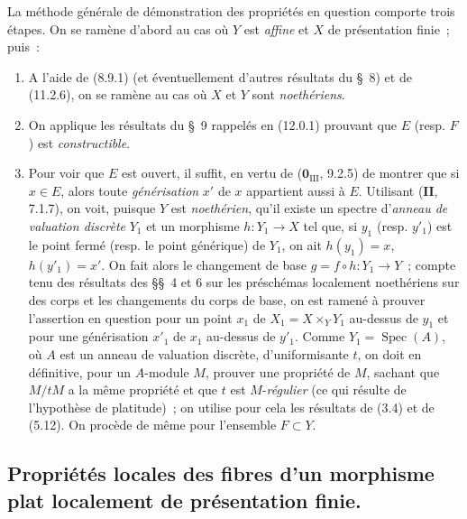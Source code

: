 \begin{env}[12.0.2]
\label{IV.12.0.2-fr}
La méthode générale de démonstration des propriétés en question comporte trois
étapes. On se ramène d'abord au cas où $Y$ est \emph{affine} et $X$ de présentation
finie~; puis~:
\begin{enumerate}[label=\Alph*)]
  \item A l'aide de (8.9.1) (et éventuellement d'autres résultats du \S~8) et
  de (11.2.6), on se ramène au cas où $X$ et $Y$ sont \emph{noethériens}.
  \item On applique les résultats du \S~9 rappelés en (12.0.1) prouvant que
  $E$ (resp. $F$) est \emph{constructible}.
  \item Pour voir que $E$ est ouvert, il suffit, en vertu de
  ($\mathbf 0_{\mathrm{III}}$, 9.2.5) de montrer que si $x\in E$, alors toute
  \emph{générisation} $x'$ de $x$ appartient aussi à $E$. Utilisant ($\mathbf{II}$,
  7.1.7), on voit, puisque $Y$ est \emph{noethérien}, qu'il existe un spectre d'\emph{anneau
  de valuation discrète} $Y_1$ et un morphisme $h:Y_1\to X$ tel que, si $y_1$
  (resp. $y'_1$) est le point fermé (resp. le point générique) de $Y_1$, on ait
  $h(y_1)=x$, $h(y'_1)=x'$. On fait alors le changement de base
  $g=f\circ h:Y_1\to Y$~; compte tenu des résultats des \S\S~4 et 6 sur les
  préschémas localement noethériens sur des corps et les changements du corps
  de base, on est ramené à prouver l'assertion en question pour un point $x_1$
  de $X_1=X\times_YY_1$ au-dessus de $y_1$ et pour une générisation $x'_1$ de
  $x_1$ au-dessus de $y'_1$. Comme $Y_1=\operatorname{Spec}(A)$, où $A$ est
  un anneau de valuation discrète, d'uniformisante $t$, on doit en définitive,
  pour un $A$-module $M$, prouver une propriété de $M$, sachant que $M/tM$ a
  la même propriété et que $t$ est $M$-\emph{régulier} (ce qui résulte de l'hypothèse
  de platitude)~; on utilise pour cela les résultats de (3.4) et de (5.12). On
  procède de même pour l'ensemble $F\subset Y$.
\end{enumerate}
\end{env}

\subsection{Propriétés locales des fibres d'un morphisme plat localement de
présentation finie.}
\label{subsection:IV.12.1-fr}

